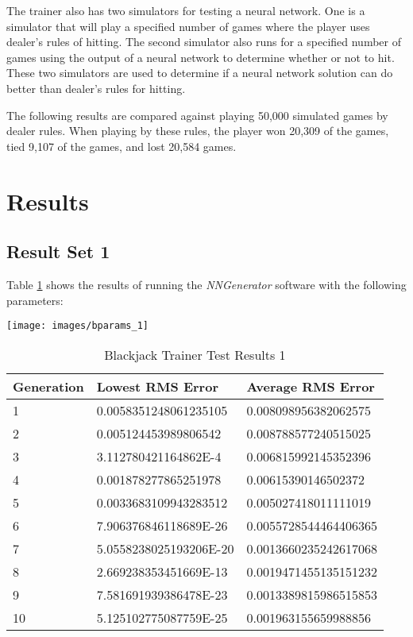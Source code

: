 The trainer also has two simulators for testing a neural network.
One is a simulator that will play a specified number of games where
the player uses dealer's rules of hitting.
The second simulator also runs for a specified number of games using
the output of a neural network to determine whether or not to hit.
These two simulators are used to determine if a neural network
solution can do better than dealer's rules for hitting.

The following results are compared against playing 50,000 simulated
games by dealer rules. 
When playing by these rules, the player won 20,309 of the games, tied 9,107 of
the games, and lost 20,584 games.

\section{Results}

\subsection{Result Set 1}

Table \ref{btr1} shows the results of running the {\it NNGenerator} software with the following parameters:

\begin{center}
\texttt{[image: images/bparams\_1]}
\end{center}

\begin{center}
    \begin{longtable}{ | l | l | l |}
      \caption{Blackjack Trainer Test Results 1} \label{btr1} \\
   \hline
  Generation & Lowest RMS Error & Average RMS Error \\ \hline
1 &	0.0058351248061235105 &	0.008098956382062575 \\ \hline
2 &	0.005124453989806542 &	0.008788577240515025 \\ \hline
3 &	3.112780421164862E-4 &	0.006815992145352396 \\ \hline
4 &	0.001878277865251978 &	0.00615390146502372 \\ \hline
5 &	0.0033683109943283512 &	0.005027418011111019 \\ \hline
6 &	7.906376846118689E-26 &	0.0055728544464406365 \\ \hline
7 &	5.0558238025193206E-20 &	0.0013660235242617068 \\ \hline
8 &	2.669238353451669E-13 &	0.0019471455135151232 \\ \hline
9 &	7.581691939386478E-23 &	0.0013389815986515853 \\ \hline
10 &	5.125102775087759E-25 &	0.001963155659988856 \\ \hline
\end{longtable}
\end{center}

